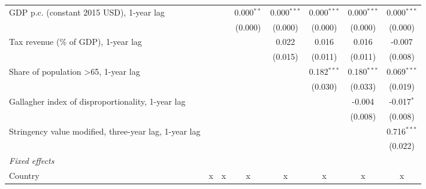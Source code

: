 \begin{table}[htbp]
\begin{tabular}{lccccccc}
      GDP p.c. (constant 2015 USD), 1-year lag                                 &                &                & 0.000$^{**}$   & 0.000$^{***}$ & 0.000$^{***}$ & 0.000$^{***}$ & 0.000$^{***}$\\   
                                                                               &                &                & (0.000)        & (0.000)       & (0.000)       & (0.000)       & (0.000)\\   
      Tax revenue (\% of GDP), 1-year lag                                      &                &                &                & 0.022         & 0.016         & 0.016         & -0.007\\   
                                                                               &                &                &                & (0.015)       & (0.011)       & (0.011)       & (0.008)\\   
      Share of population >65, 1-year lag                                      &                &                &                &               & 0.182$^{***}$ & 0.180$^{***}$ & 0.069$^{***}$\\   
                                                                               &                &                &                &               & (0.030)       & (0.033)       & (0.019)\\   
      Gallagher index of disproportionality, 1-year lag                        &                &                &                &               &               & -0.004        & -0.017$^{*}$\\   
                                                                               &                &                &                &               &               & (0.008)       & (0.008)\\   
      Stringency value modified, three-year lag, 1-year lag                    &                &                &                &               &               &               & 0.716$^{***}$\\   
                                                                               &                &                &                &               &               &               & (0.022)\\   
      \emph{Fixed effects}\\
      Country                                                                  & x              & x              & x              & x             & x             & x             & x\\  

\end{tabular}
\end{table}
